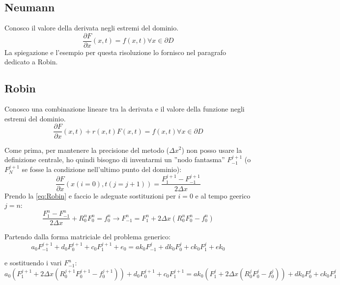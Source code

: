 \documentclass[]{article}
\newcommand{\pde}[2]{\ensuremath{\frac{\partial #1}{\partial #2}}}
\newcommand{\lr}[3]{\ensuremath{\left#1 #3 \right#2}}
\newcommand{\lrt}[1]{\lr{(}{)}{#1}}
\numberwithin{equation}{subsection}
\begin{document}
\subsection{Neumann}
Conosco il valore della derivata negli estremi del dominio.
\begin{equation}
\pde Fx(x,t) = f(x,t) \forall x \in \partial D
\end{equation}
La spiegazione e l'esempio per questa risoluzione lo fornisco nel paragrafo dedicato a Robin.

\subsection{Robin}
Conosco una combinazione lineare tra la derivata e il valore della funzione negli estremi del dominio.
\begin{equation}\label{eq:Robin}
\pde Fx(x,t) +r(x,t) F(x,t) = f(x,t) \forall x \in \partial D
\end{equation}

Come prima, per mantenere la precisione del metodo ($\Delta x^2$) non posso usare la definizione  centrale,  ho quindi bisogno di inventarmi un ''nodo fantasma'' $F_{-1}^{j+1}$ (o $F_{N}^{j+1}$ se fosse la condizione nell'ultimo punto del dominio):
\begin{equation}
\pde Fx(x(i=0),t(j=j+1)) = \frac{F_{1}^{j+1}-F_{-1}^{j+1}}{2\Delta x}
\end{equation}
Prendo la \eqref{eq:Robin} e faccio le adeguate sostituzioni per $i=0$ e al tempo geerico $j=n$:
\begin{equation}
\frac{F_{1}^{n}-F_{-1}^{n}}{2\Delta x} + R_0^nF_{0}^{n} = f_0^n  \to 
F_{-1}^{n} = F_{1}^{n} + 2\Delta x \lrt{R_0^nF_{0}^{n}-f^n_0}
\end{equation}

Partendo dalla forma matriciale del problema generico:
\begin{equation}
a_0  F_{-1}^{j+1} + d_0 F_{0}^{j+1} + c_{0}F_{1}^{j+1} + e_0 = 
ak_0 F_{-1}^{j}   + dk_0 F_{0}^{j}  + ck_0 F_{1}^{j} + ek_0
\end{equation}

e sostituendo i vari $F_{-1}^{n}$:
\begin{equation}
a_0 \lrt{ F_{1}^{j+1} + 2 \Delta x \lrt{R_0^{j+1}F_{0}^{j+1}-f^{j+1}_0}} +d_0 F_{0}^{j+1} +c_{0}F_{1}^{j+1} = 
ak_0 \lrt{F_{1}^{j} + 2 \Delta x \lrt{R_0^jF_{0}^{j}-f^{j}_0}} + dk_0 F_{0}^{j} + ck_0 F_{1}^{j}
\end{equation}
\end{document}
